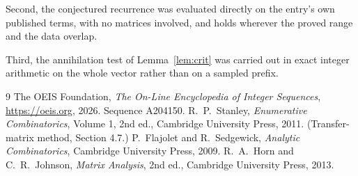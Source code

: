 \documentclass[11pt,a4paper]{article}
\theoremstyle{plain}
\theoremstyle{definition}
\begin{document}
Second, the conjectured recurrence was evaluated directly on the entry's own published terms,
with no matrices involved, and holds wherever the proved range and the data overlap.

Third, the annihilation test of Lemma~\ref{lem:crit} was carried out in exact integer
arithmetic on the whole vector rather than on a sampled prefix.

\begin{thebibliography}{9}
 The OEIS Foundation, \emph{The On-Line Encyclopedia of Integer
Sequences}, \url{https://oeis.org}, 2026. Sequence A204150.
 R.~P.~Stanley, \emph{Enumerative Combinatorics}, Volume 1, 2nd ed.,
Cambridge University Press, 2011. (Transfer-matrix method, Section 4.7.)
 P.~Flajolet and R.~Sedgewick, \emph{Analytic Combinatorics}, Cambridge
University Press, 2009.
 R.~A.~Horn and C.~R.~Johnson, \emph{Matrix Analysis}, 2nd ed., Cambridge
University Press, 2013.
\end{thebibliography}
\end{document}
